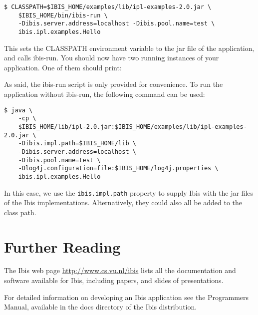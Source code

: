 \documentclass[a4paper,10pt]{article}
\begin{document}
\noindent
{\small
\begin{verbatim}
$ CLASSPATH=$IBIS_HOME/examples/lib/ipl-examples-2.0.jar \
    $IBIS_HOME/bin/ibis-run \
    -Dibis.server.address=localhost -Dibis.pool.name=test \
    ibis.ipl.examples.Hello
\end{verbatim}
}
\noindent

This sets the CLASSPATH environment variable to the jar file of the
application, and calls ibis-run. You should now have two running
instances of your application. One of them should print:

\noindent {\small \begin{verbatim} Server received: Hi there
\end{verbatim} } \noindent 

As said, the ibis-run script is only provided for convenience. To run
the application without ibis-run, the following command can be used:

\noindent
{\small
\begin{verbatim}
$ java \
    -cp \
    $IBIS_HOME/lib/ipl-2.0.jar:$IBIS_HOME/examples/lib/ipl-examples-2.0.jar \
    -Dibis.impl.path=$IBIS_HOME/lib \
    -Dibis.server.address=localhost \
    -Dibis.pool.name=test \
    -Dlog4j.configuration=file:$IBIS_HOME/log4j.properties \
    ibis.ipl.examples.Hello
\end{verbatim}
}
\noindent

In this case, we use the \texttt{ibis.impl.path} property to supply Ibis
with the jar files of the Ibis implementations. Alternatively, they
could also all be added to the class path.

\section{Further Reading}

The Ibis web page \url{http://www.cs.vu.nl/ibis} lists all
the documentation and software available for Ibis, including papers, and
slides of presentations.

For detailed information on developing an Ibis application see the
Programmers Manual, available in the docs directory of the Ibis
distribution.
\end{document}
